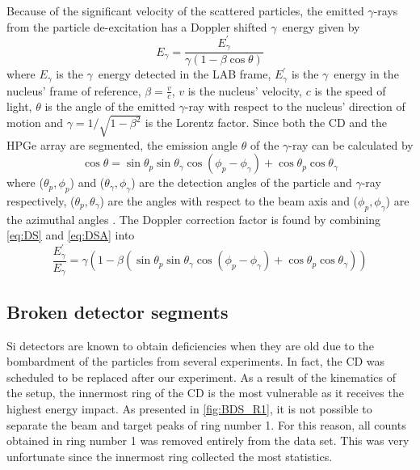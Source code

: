 \documentclass[twoside,english]{uiofysmaster/uiofysmaster}
\newcommand{\ga}{$\gamma$}
\let\orgautoref\autoref
\renewcommand{\autoref}
        {%
		 \def\sectionautorefname{Section}%
		 \def\subsectionautorefname{Section}%
		 \def\subsubsectionautorefname{Section}%
		 \def\chapterautorefname{Chapter}%
          \orgautoref}
\begin{document}
Because of the significant velocity of the scattered particles, the emitted \ga-rays from the particle de-excitation has a Doppler shifted \ga\ energy given by 
\begin{equation}\label{eq:DS}
	E_\gamma = \frac{E_\gamma^{'}}{\gamma (1 - \beta \cos \theta)}
\end{equation}
where $E_\gamma$ is the \ga\ energy detected in the LAB frame, $E_\gamma^{'}$ is the \ga\ energy in the nucleus' frame of reference, $\beta = \frac{v}{c}$, $v$ is the nucleus' velocity, $c$ is the speed of light, $\theta$ is the angle of the emitted \ga-ray with respect to the nucleus' direction of motion and $\gamma = 1/\sqrt{1 - \beta^2}$ is the Lorentz factor. Since both the CD and the HPGe array are segmented, the emission angle $\theta$ of the \ga-ray can be calculated by 
\begin{equation}\label{eq:DSA}
	\cos \theta = \sin \theta_p \sin \theta_\gamma \cos (\phi_p - \phi_\gamma) + \cos \theta_p \cos \theta_\gamma
\end{equation}
where ($\theta_p, \phi_p$) and ($\theta_\gamma, \phi_\gamma$) are the detection angles of the particle and \ga-ray respectively, ($\theta_p, \theta_\gamma$) are the angles with respect to the beam axis and ($\phi_p, \phi_\gamma$) are the azimuthal angles \cite{RIBF2012, MB-spect}. The Doppler correction factor is found by combining \autoref{eq:DS} and \autoref{eq:DSA} into
\begin{equation}
	\frac{E_\gamma^{'}}{E_\gamma} = \gamma (1 - \beta (\sin \theta_p \sin \theta_\gamma \cos (\phi_p - \phi_\gamma) + \cos \theta_p \cos \theta_\gamma))
\end{equation}





\subsection{Broken detector segments}\label{sec:BDS}

Si detectors are known to obtain deficiencies when they are old due to the bombardment of the particles from several experiments.
In fact, the CD was scheduled to be replaced after our experiment. 
As a result of the kinematics of the setup, the innermost ring of the CD is the most vulnerable as it receives the highest energy impact. 
As presented in \autoref{fig:BDS_R1}, it is not possible to separate the beam and target peaks of ring number 1. 
For this reason, all counts obtained in ring number 1 was removed entirely from the data set.
This was very unfortunate since the innermost ring collected the most statistics.
\end{document}
